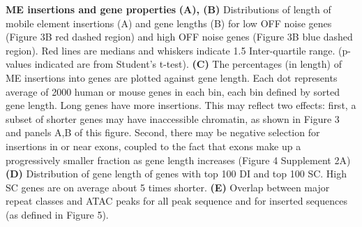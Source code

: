 \textbf{ME insertions and gene properties}\textbf{ (A), (B)} Distributions of length of mobile element insertions (A) and gene lengths (B) for low OFF noise genes (Figure 3B red dashed region) and high OFF noise genes (Figure 3B blue dashed region). Red lines are medians and whiskers indicate 1.5 Inter-quartile range. (p-values indicated are from Student’s t-test). \textbf{(C)} The percentages (in length) of ME insertions into genes are plotted against gene length. Each dot represents average of 2000 human or mouse genes in each bin, each bin defined by sorted gene length. Long genes have more insertions. This may reflect two effects: first, a subset of shorter genes may have inaccessible chromatin, as shown in Figure 3 and panels A,B of this figure. Second, there may be negative selection for insertions in or near exons, coupled to the fact that exons make up a progressively smaller fraction as gene length increases (Figure 4 Supplement 2A) \textbf{(D)} Distribution of gene length of genes with top 100 DI and top 100 SC. High SC genes are on average about 5 times shorter. \textbf{(E)} Overlap between major repeat classes and ATAC peaks for all peak sequence and for inserted sequences (as defined in Figure 5).